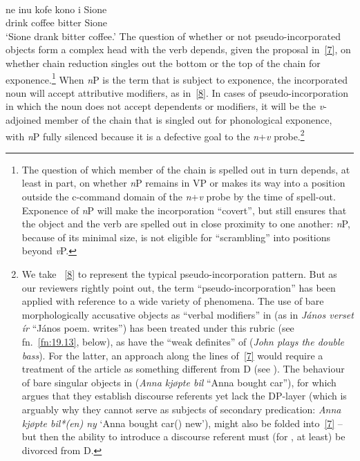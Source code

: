 \documentclass[output=paper]{langsci/langscibook}
\begin{document}
\begin{refcontext}
\ea {}\\
    \gll ne inu kofe kono i Sione \label{8}\\
    \Pst{} drink coffee bitter \Abs{} Sione\\
    \glt \enquote*{Sione drank bitter coffee.}
\z
The question of whether or not pseudo-incorporated objects form a complex head
with the verb depends, given the proposal in~\eqref{7}, on whether chain
reduction singles out the bottom or the top of the chain for
exponence.\footnote{The question of which member of the chain is spelled out in
    turn depends, at least in part, on whether \emph{n}P remains in VP or makes
    its way into a position outside the c-command domain of the
    \emph{n}+\emph{v} probe by the time of spell-out.  Exponence of \emph{n}P
    will make the incorporation \enquote{covert}, but still ensures that the object
    and the verb are spelled out in close proximity to one another: \emph{n}P,
because of its minimal size, is not eligible for \enquote{scrambling} into positions
beyond \emph{v}P.} When \emph{n}P is the term that is subject to exponence, the
incorporated noun will accept attributive modifiers, as in~\eqref{8}. In cases of
pseudo-incorporation in which the noun does not accept dependents or modifiers,
it will be the \emph{v}-adjoined member of the chain that is singled out for
phonological exponence, with \emph{n}P fully silenced because it is a defective
goal to the \emph{n}+\emph{v} probe.\footnote{We take ~\eqref{8} to
    represent the typical pseudo-incorporation pattern. But as our reviewers
    rightly point out, the term \enquote{pseudo-incorporation} has been applied with
    reference to a wide variety of phenomena. The use of bare morphologically
    accusative objects as \enquote{verbal modifiers} in  (as in \emph{János
    verset ír} \enquote{János poem.\Acc{} writes}) has been treated under this
    rubric (see fn.\ \ref{fn:19.13}, below), as have the \enquote{weak definites} of 
    (\emph{John plays the double bass}). For the latter, an approach along the
    lines of~\eqref{7} would require a treatment of the article as something
    different from D (see \citealt{zamparelli}). The behaviour of bare singular
    objects in  (\emph{Anna kj\o{}pte bil} \enquote{Anna bought car}), for
    which \citet{kallullidiss} argues that they establish discourse referents
    yet lack the DP-layer (which is arguably why they cannot serve as subjects
of secondary predication: \emph{Anna kj\o{}pte bil*(en) ny} \enquote*{Anna
bought car(\Def{}) new}), might also be folded into~\eqref{7} -- but then the
ability to introduce a discourse referent must (for , at least) be
divorced from D.\label{fn:19.7}}


\end{refcontext}
\end{document}
